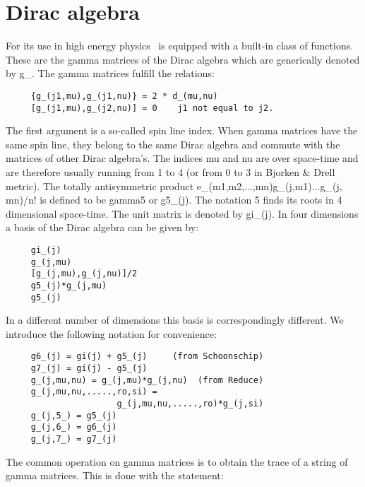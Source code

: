 
\chapter{Dirac algebra}
\label{gammaalgebra}

For its use in high energy physics \FORM\ is 
equipped with a built-in class of functions. These are the 
gamma matrices of the Dirac 
algebra which are generically denoted by g\_. The gamma matrices 
fulfill the relations:
\begin{verbatim}
     {g_(j1,mu),g_(j1,nu)} = 2 * d_(mu,nu)
     [g_(j1,mu),g_(j2,nu)] = 0    j1 not equal to j2.
\end{verbatim}
The first argument is a so-called spin line index. When 
gamma matrices have the same spin line, they belong to the same Dirac 
algebra and commute with the matrices of other Dirac algebra's. The indices 
mu and nu are over space-time and are therefore usually running from 1 to 4 
(or from 0 to 3 in Bjorken \& Drell metric). 
The totally antisymmetric product e\_(m1,m2,...,mn)\*g\_(j,m1)\*...\*g\_(j,
mn)/n! is defined to be gamma5 or g5\_(j). The notation 5 finds 
its roots in 4 dimensional space-time. The unit matrix is denoted by 
gi\_(j). In four dimensions a basis of the Dirac algebra can be given by: 
\begin{verbatim}
     gi_(j)
     g_(j,mu)
     [g_(j,mu),g_(j,nu)]/2
     g5_(j)*g_(j,mu)
     g5_(j)
\end{verbatim}
In a different number of dimensions this basis is correspondingly 
different. We introduce the following notation for convenience: 
\begin{verbatim}
     g6_(j) = gi(j) + g5_(j)     (from Schoonschip)
     g7_(j) = gi(j) - g5_(j)
     g_(j,mu,nu) = g_(j,mu)*g_(j,nu)  (from Reduce)
     g_(j,mu,nu,.....,ro,si) =
                      g_(j,mu,nu,.....,ro)*g_(j,si)
     g_(j,5_) = g5_(j)
     g_(j,6_) = g6_(j)
     g_(j,7_) = g7_(j)
\end{verbatim}
The common operation on gamma matrices is to obtain the trace 
of a string of gamma matrices. This is done with the statement:


